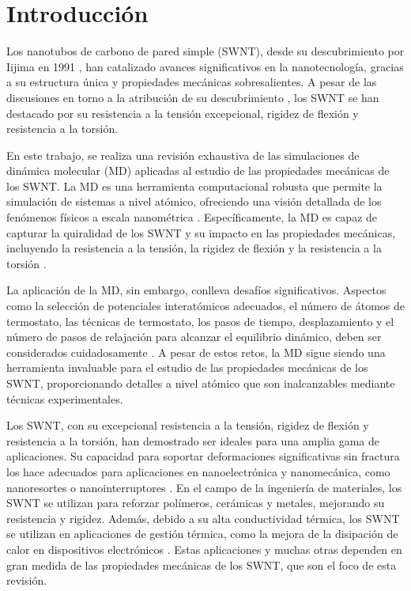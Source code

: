 \documentclass[a4paper]{article}
\newcommand{\keywordsenglishname}{Keywords}
\renewenvironment{abstract}{%
        \begin{center}
	\begin{minipage}{14cm}
	{\textbf{\abstractname:}}
}{
        \end{minipage}
	\end{center}
}
\newenvironment{keywordsenglish}{
        \def\abstractname{\emph{\keywordsenglishname}}
	\begin{abstract}
}{
        \end{abstract}
}
\begin{document}

\section{Introducción}
Los nanotubos de carbono de pared simple (SWNT), desde su descubrimiento por Iijima en 1991 \cite{iijima1991}, han catalizado avances significativos en la nanotecnología, gracias a su estructura única y propiedades mecánicas sobresalientes. A pesar de las discusiones en torno a la atribución de su descubrimiento \cite{monthioux2006}, los SWNT se han destacado por su resistencia a la tensión excepcional, rigidez de flexión y resistencia a la torsión.

En este trabajo, se realiza una revisión exhaustiva de las simulaciones de dinámica molecular (MD) aplicadas al estudio de las propiedades mecánicas de los SWNT. La MD es una herramienta computacional robusta que permite la simulación de sistemas a nivel atómico, ofreciendo una visión detallada de los fenómenos físicos a escala nanométrica \cite{najmi2023review}. Específicamente, la MD es capaz de capturar la quiralidad de los SWNT y su impacto en las propiedades mecánicas, incluyendo la resistencia a la tensión, la rigidez de flexión y la resistencia a la torsión \cite{shibuta2003molecular}.

La aplicación de la MD, sin embargo, conlleva desafíos significativos. Aspectos como la selección de potenciales interatómicos adecuados, el número de átomos de termostato, las técnicas de termostato, los pasos de tiempo, desplazamiento y el número de pasos de relajación para alcanzar el equilibrio dinámico, deben ser considerados cuidadosamente \cite{mylvaganam2004important}. A pesar de estos retos, la MD sigue siendo una herramienta invaluable para el estudio de las propiedades mecánicas de los SWNT, proporcionando detalles a nivel atómico que son inalcanzables mediante técnicas experimentales.

Los SWNT, con su excepcional resistencia a la tensión, rigidez de flexión y resistencia a la torsión, han demostrado ser ideales para una amplia gama de aplicaciones. Su capacidad para soportar deformaciones significativas sin fractura los hace adecuados para aplicaciones en nanoelectrónica y nanomecánica, como nanoresortes o nanointerruptores \cite{avila2008molecular}. En el campo de la ingeniería de materiales, los SWNT se utilizan para reforzar polímeros, cerámicas y metales, mejorando su resistencia y rigidez. Además, debido a su alta conductividad térmica, los SWNT se utilizan en aplicaciones de gestión térmica, como la mejora de la disipación de calor en dispositivos electrónicos \cite{chen2010molecular}. Estas aplicaciones y muchas otras dependen en gran medida de las propiedades mecánicas de los SWNT, que son el foco de esta revisión.
\end{document}
